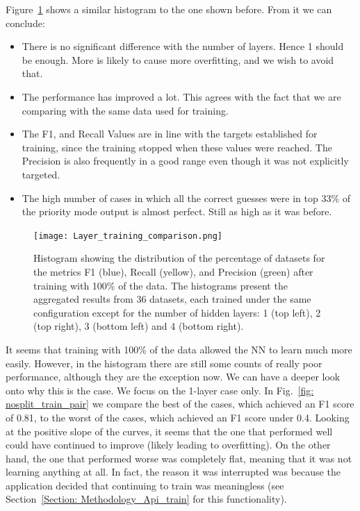 \documentclass[a4paper, 11pt]{report}
\begin{document}
    Figure~\ref{fig: layer_performance} shows a similar histogram to the one shown before. From it we can conclude:

    \begin{itemize}
        \item There is no significant difference with the number of layers. Hence 1 should be enough. More is likely to cause more overfitting, and we wish to avoid that.
        \item The performance has improved a lot. This agrees with the fact that we are comparing with the same data used for training.
        \item The F1, and Recall Values are in line with the targets established for training, since the training stopped when these values were reached. The Precision is also frequently in a good range even though it was not explicitly targeted.
        \item The high number of cases in which all the correct guesses were in top 33\% of the priority mode output is almost perfect.  Still as high as it was before.
    \end{itemize}

    \begin{figure}[ht!]
        \centering
        \texttt{[image: Layer\_training\_comparison.png]}
        \caption[Performance by layer count]{Histogram showing the distribution of the percentage of datasets for the metrics F1 (blue), Recall (yellow), and Precision (green) after training with 100\% of the data. The histograms present the aggregated results from 36 datasets, each trained under the same configuration except for the number of hidden layers: 1 (top left), 2 (top right), 3 (bottom left) and 4 (bottom right).}
        \label{fig: layer_performance}
    \end{figure}

    It seems that training with 100\% of the data allowed the NN to learn much more easily. However, in the histogram there are still some counts  of really poor performance, although they are the exception now. We can have a deeper look onto why this is the case. We focus on the 1-layer case only. In Fig.~\ref{fig: nosplit_train_pair} we compare the best of the cases, which achieved an F1 score of 0.81, to the worst of the cases, which achieved an F1 score under 0.4. Looking at the positive slope of the curves, it seems that the one that performed well could have continued to improve (likely leading to overfitting). On the other hand, the one that performed worse was completely flat, meaning that it was not learning anything at all. In fact, the reason it was interrupted was because the application decided that continuing to train was meaningless (see Section~\ref{Section: Methodology_Api_train} for this functionality).
\end{document}
